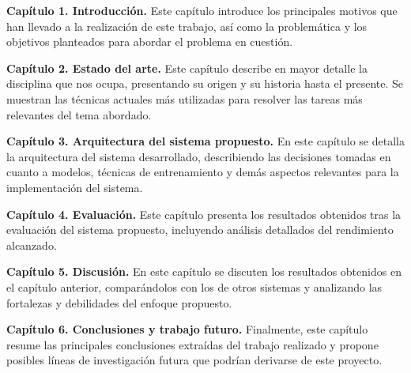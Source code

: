 \begin{description}
    \item \textbf{Capítulo 1. Introducción.} Este capítulo introduce los principales motivos que han llevado a la realización de este trabajo, así como la problemática y los objetivos planteados para abordar el problema en cuestión.
    \item \textbf{Capítulo 2. Estado del arte.} Este capítulo describe en mayor detalle la disciplina que nos ocupa, presentando su origen y su historia hasta el presente. Se muestran las técnicas actuales más utilizadas para resolver las tareas más relevantes del tema abordado.
    \item \textbf{Capítulo 3. Arquitectura del sistema propuesto.} En este capítulo se detalla la arquitectura del sistema desarrollado, describiendo las decisiones tomadas en cuanto a modelos, técnicas de entrenamiento y demás aspectos relevantes para la implementación del sistema.
    \item \textbf{Capítulo 4. Evaluación.} Este capítulo presenta los resultados obtenidos tras la evaluación del sistema propuesto, incluyendo análisis detallados del rendimiento alcanzado.
    \item \textbf{Capítulo 5. Discusión.} En este capítulo se discuten los resultados obtenidos en el capítulo anterior, comparándolos con los de otros sistemas y analizando las fortalezas y debilidades del enfoque propuesto.
    \item \textbf{Capítulo 6. Conclusiones y trabajo futuro.} Finalmente, este capítulo resume las principales conclusiones extraídas del trabajo realizado y propone posibles líneas de investigación futura que podrían derivarse de este proyecto.
\end{description}